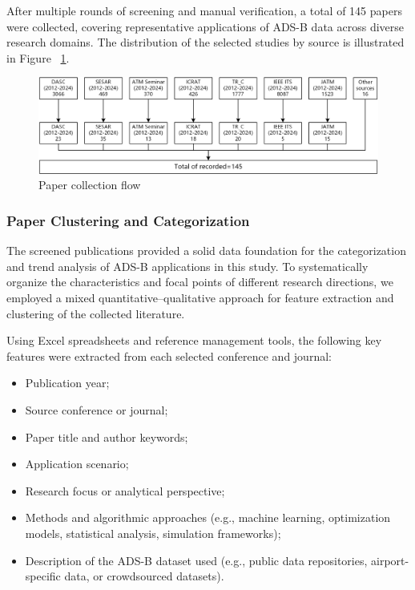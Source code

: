 After multiple rounds of screening and manual verification, a total of 145 papers were collected, covering representative applications of ADS-B data across diverse research domains. The distribution of the selected studies by source is illustrated in Figure ~\ref{fig:placeholder}.

\begin{figure}
    \centering
    \includegraphics[width=1\linewidth]{paper_selection1.png}
    \caption{Paper collection flow}
    \label{fig:placeholder}
\end{figure}
\subsubsection{Paper Clustering and Categorization}

The screened publications provided a solid data foundation for the categorization and trend analysis of ADS-B applications in this study. To systematically organize the characteristics and focal points of different research directions, we employed a mixed quantitative–qualitative approach for feature extraction and clustering of the collected literature.

Using Excel spreadsheets and reference management tools, the following key features were extracted from each selected conference and journal:
\begin{itemize}
    \item Publication year;
    \item Source conference or journal;
    \item Paper title and author keywords;
    \item Application scenario;
    \item Research focus or analytical perspective;
    \item Methods and algorithmic approaches (e.g., machine learning, optimization models, statistical analysis, simulation frameworks);
    \item Description of the ADS-B dataset used (e.g., public data repositories, airport-specific data, or crowdsourced datasets).
\end{itemize}


